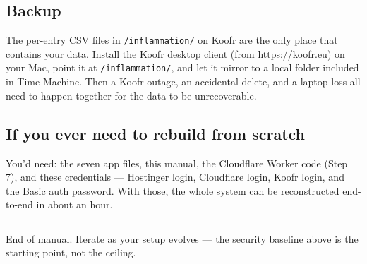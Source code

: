 \documentclass[11pt,a4paper]{article}
\begin{document}
\subsection{Backup}

The per-entry CSV files in \texttt{/inflammation/} on Koofr are the only place that contains your data. Install the Koofr desktop client (from \url{https://koofr.eu}) on your Mac, point it at \texttt{/inflammation/}, and let it mirror to a local folder included in Time Machine. Then a Koofr outage, an accidental delete, and a laptop loss all need to happen together for the data to be unrecoverable.

\subsection{If you ever need to rebuild from scratch}

You'd need: the seven app files, this manual, the Cloudflare Worker code (Step 7), and these credentials --- Hostinger login, Cloudflare login, Koofr login, and the Basic auth password. With those, the whole system can be reconstructed end-to-end in about an hour.

\vspace{1.5em}
\hrule
\vspace{6pt}
\small\color{gray}
End of manual. Iterate as your setup evolves --- the security baseline above is the starting point, not the ceiling.
\end{document}
